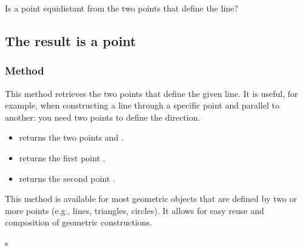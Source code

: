 Is a point equidistant from the two points that define the line?

\begin{tkzexample}[latex=.5\textwidth]
\begin{center}
\end{center}
\end{tkzexample}

\subsection{The result is a point} %


\subsubsection{Method } %
\label{ssub:method_line_get}

This method retrieves the two points that define the given line. It is useful, for example, when constructing a line through a specific point and parallel to another: you need two points to define the direction.

\begin{itemize}
  \item {} returns the two points  and .
  \item {} returns the first point .
  \item {} returns the second point .
\end{itemize}

This method is available for most geometric objects that are defined by two or more points (e.g., lines, triangles, circles). It allows for easy reuse and composition of geometric constructions.


\begin{tkzexample}[latex=.35\textwidth]
    
\end{tkzexample}
s


